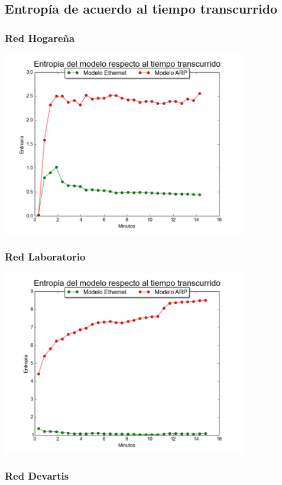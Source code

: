 \subsection{Entropía de acuerdo al tiempo transcurrido}

\subsubsection{Red Hogareña}


\centerline{\includegraphics[width=0.8\textwidth]{./graficos/entrophyVSTime/casa_mari.png}}


\subsubsection{Red Laboratorio}


\centerline{\includegraphics[width=0.8\textwidth]{./graficos/entrophyVSTime/labo5.png}}


\newpage
\subsubsection{Red Devartis}


